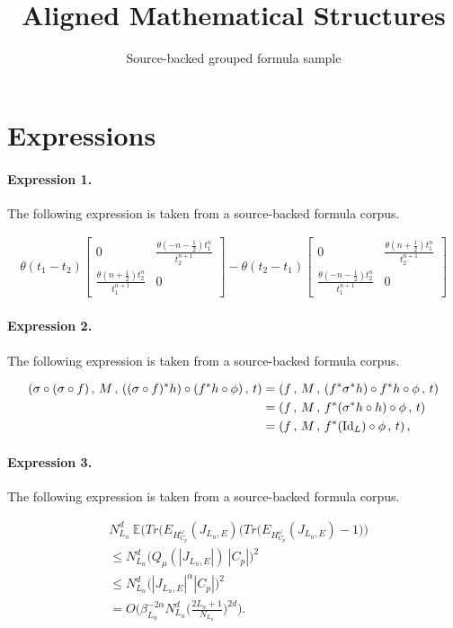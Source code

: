 \documentclass[11pt]{article}
\title{Aligned Mathematical Structures}
\author{Source-backed grouped formula sample}
\date{}
\begin{document}
\maketitle
\section{Expressions}
\paragraph{Expression 1.} The following expression is taken from a source-backed formula corpus.

\begin{align*}\theta (t_1-t_2)\left[ \begin{array}{cc}0 & \frac{\theta (-n-\frac 12)t_1^n}{t_2^{n+1}} \\ \frac{\theta (n+\frac 12)t_2^n}{t_1^{n+1}} & 0\end{array}\right] -\theta (t_2-t_1)\left[ \begin{array}{cc}0 & \frac{\theta (n+\frac 12)t_1^n}{t_2^{n+1}} \\ \frac{\theta (-n-\frac 12)t_2^n}{t_1^{n+1}} & 0\end{array}\right] \end{align*}

\paragraph{Expression 2.} The following expression is taken from a source-backed formula corpus.

\begin{align*}\left(\sigma\circ(\sigma\circ f)\,,\, M\,,\, ((\sigma\circ f)^*h)\circ(f^*h\circ \phi)\,,\,t\right) &= \left(f\,,\,M\,,\,(f^*\sigma^*h)\circ f^*h\circ \phi\,,\, t\right) \\&= \left(f\,,\,M\,,\,f^*(\sigma^*h\circ h)\circ \phi\,,\,t\right) \\&= \left(f\,,\,M\,,\,f^*(\textnormal{Id}_L)\circ\phi\,,\,t\right), \,\,\,\end{align*}

\paragraph{Expression 3.} The following expression is taken from a source-backed formula corpus.

\begin{align*} & N_{L_n}^d~\mathbb{E}\bigg(Tr(E_{H^\omega_{C_p}}(J_{L_n,E})\big(Tr(E_{H^\omega_{C_p}}(J_{L_n,E})-1\big)\bigg) \\ &\leq N_{L_n}^d\bigg(Q_{\mu}(|J_{L_n,E}|)~|C_p|\bigg)^2 \\&\leq N_{L_n}^d\big(|J_{L_n,E}|^\alpha |C_p|\big)^2\\&=O\bigg(\beta_{L_n}^{-2\alpha}N_{L_n}^d\bigg(\frac{2L_n+1}{N_{L_n}}\bigg)^{2d}\bigg).\end{align*}
\end{document}
